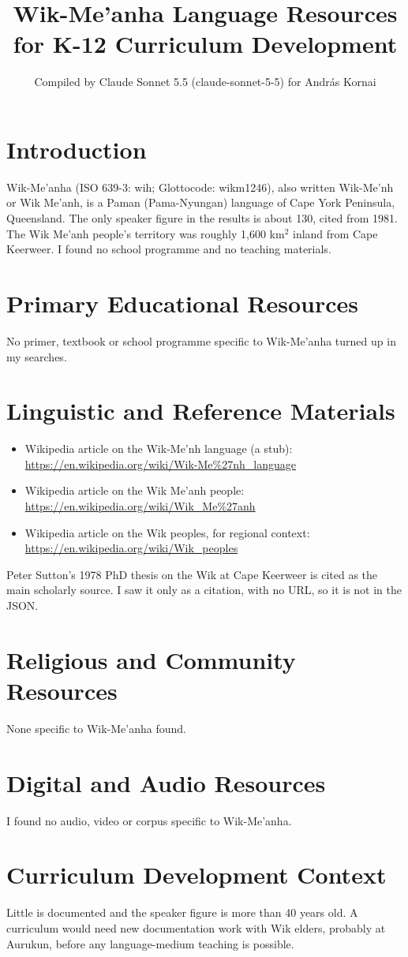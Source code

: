 \documentclass[12pt]{article}
\title{Wik-Me'anha Language Resources for K-12 Curriculum Development}
\author{Compiled by Claude Sonnet 5.5 (claude-sonnet-5-5) for Andr\'as Kornai}
\date{}
\begin{document}
\maketitle

\section{Introduction}
Wik-Me'anha (ISO 639-3: wih; Glottocode: wikm1246), also written Wik-Me'nh or Wik Me'anh, is a Paman (Pama-Nyungan) language of Cape York Peninsula, Queensland. The only speaker figure in the results is about 130, cited from 1981. The Wik Me'anh people's territory was roughly 1,600 km$^2$ inland from Cape Keerweer. I found no school programme and no teaching materials.

\section{Primary Educational Resources}
No primer, textbook or school programme specific to Wik-Me'anha turned up in my searches.

\section{Linguistic and Reference Materials}
\begin{itemize}
\item Wikipedia article on the Wik-Me'nh language (a stub): \url{https://en.wikipedia.org/wiki/Wik-Me%27nh_language}
\item Wikipedia article on the Wik Me'anh people: \url{https://en.wikipedia.org/wiki/Wik_Me%27anh}
\item Wikipedia article on the Wik peoples, for regional context: \url{https://en.wikipedia.org/wiki/Wik_peoples}
\end{itemize}
Peter Sutton's 1978 PhD thesis on the Wik at Cape Keerweer is cited as the main scholarly source. I saw it only as a citation, with no URL, so it is not in the JSON.

\section{Religious and Community Resources}
None specific to Wik-Me'anha found.

\section{Digital and Audio Resources}
I found no audio, video or corpus specific to Wik-Me'anha.

\section{Curriculum Development Context}
Little is documented and the speaker figure is more than 40 years old. A curriculum would need new documentation work with Wik elders, probably at Aurukun, before any language-medium teaching is possible.
\end{document}
